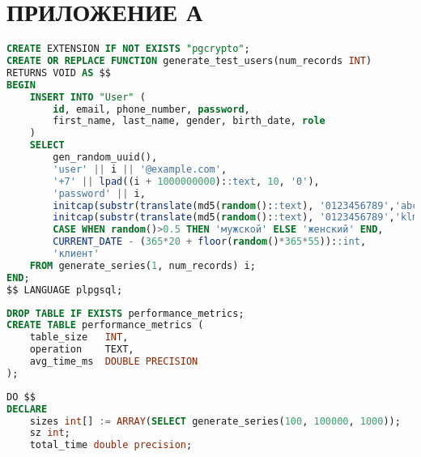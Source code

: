 \section*{ПРИЛОЖЕНИЕ А}

\begin{lstlisting}[language=SQL,
	label=alg:perf_gen,
	caption={Функция генерации тестовых пользователей}]
CREATE EXTENSION IF NOT EXISTS "pgcrypto";
CREATE OR REPLACE FUNCTION generate_test_users(num_records INT)
RETURNS VOID AS $$
BEGIN
	INSERT INTO "User" (
		id, email, phone_number, password,
		first_name, last_name, gender, birth_date, role
	)
	SELECT 
		gen_random_uuid(),
		'user' || i || '@example.com',
		'+7' || lpad((i + 1000000000)::text, 10, '0'),
		'password' || i,
		initcap(substr(translate(md5(random()::text), '0123456789','abcdefghij'),1,8)),
		initcap(substr(translate(md5(random()::text), '0123456789','klmnopqrst'),1,10)),
		CASE WHEN random()>0.5 THEN 'мужской' ELSE 'женский' END,
		CURRENT_DATE - (365*20 + floor(random()*365*55))::int,
		'клиент'
	FROM generate_series(1, num_records) i;
END;
$$ LANGUAGE plpgsql;
\end{lstlisting}

\begin{lstlisting}[language=SQL,
	label=alg:perf_table,
	caption={Таблица для хранения результатов замеров времени}]
DROP TABLE IF EXISTS performance_metrics;
CREATE TABLE performance_metrics (
	table_size   INT,
	operation    TEXT,
	avg_time_ms  DOUBLE PRECISION
);
\end{lstlisting}

\begin{lstlisting}[language=SQL,
	label=alg:perf_study,
	caption={Исследование производительности операций \texttt{INSERT}, \texttt{SELECT}, \texttt{UPDATE} и \texttt{DELETE} на таблице \texttt{User} -- начало},
	captionpos=t,
	basicstyle=\ttfamily\small]
DO $$
DECLARE
	sizes int[] := ARRAY(SELECT generate_series(100, 100000, 1000));
	sz int;
	total_time double precision;
\end{lstlisting}

